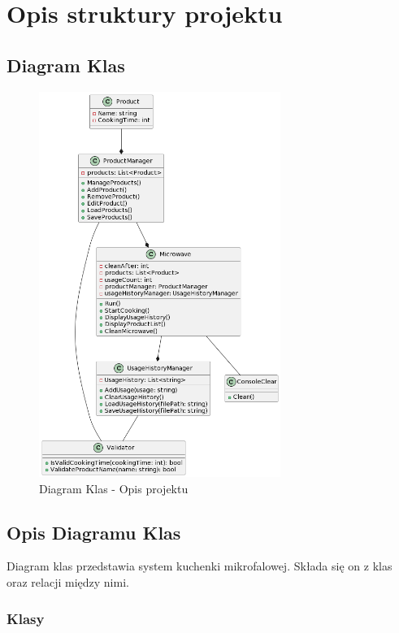 \chapter{Opis struktury projektu}
\section{Diagram Klas}
\begin{figure}[h]
    \centering
    \includegraphics[width=0.7\textwidth]{Diagram.png}
      \caption{Diagram Klas - Opis projektu}
    \label{fig:example}
\end{figure}

\newpage

\section{Opis Diagramu Klas}

Diagram klas przedstawia system kuchenki mikrofalowej. Składa się on z klas oraz relacji między nimi.

\subsection{Klasy}


